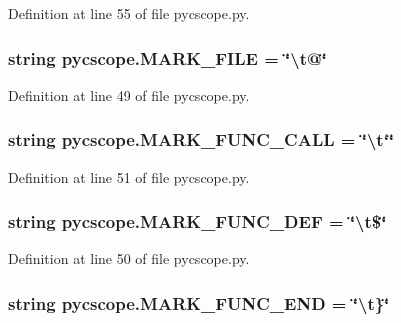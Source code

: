 Definition at line 55 of file pycscope.\-py.

\hypertarget{namespacepycscope_a009264ba488fb81f5c2faf236dc2957e}{
\subsubsection[{M\-A\-R\-K\-\_\-\-F\-I\-L\-E}]{\setlength{\rightskip}{0pt plus 5cm}string pycscope.\-M\-A\-R\-K\-\_\-\-F\-I\-L\-E = \char`\"{}\textbackslash{}t@\char`\"{}}}\label{namespacepycscope_a009264ba488fb81f5c2faf236dc2957e}


Definition at line 49 of file pycscope.\-py.

\hypertarget{namespacepycscope_a0ebe5a435fd0cdaa563d5be84886462d}{
\subsubsection[{M\-A\-R\-K\-\_\-\-F\-U\-N\-C\-\_\-\-C\-A\-L\-L}]{\setlength{\rightskip}{0pt plus 5cm}string pycscope.\-M\-A\-R\-K\-\_\-\-F\-U\-N\-C\-\_\-\-C\-A\-L\-L = \char`\"{}\textbackslash{}t`\char`\"{}}}\label{namespacepycscope_a0ebe5a435fd0cdaa563d5be84886462d}


Definition at line 51 of file pycscope.\-py.

\hypertarget{namespacepycscope_a8ff1f31aa6b2351ef03016d3c8691e90}{
\subsubsection[{M\-A\-R\-K\-\_\-\-F\-U\-N\-C\-\_\-\-D\-E\-F}]{\setlength{\rightskip}{0pt plus 5cm}string pycscope.\-M\-A\-R\-K\-\_\-\-F\-U\-N\-C\-\_\-\-D\-E\-F = \char`\"{}\textbackslash{}t\$\char`\"{}}}\label{namespacepycscope_a8ff1f31aa6b2351ef03016d3c8691e90}


Definition at line 50 of file pycscope.\-py.

\hypertarget{namespacepycscope_aca9e6d1a164786d3fe1cd678d995c31f}{
\subsubsection[{M\-A\-R\-K\-\_\-\-F\-U\-N\-C\-\_\-\-E\-N\-D}]{\setlength{\rightskip}{0pt plus 5cm}string pycscope.\-M\-A\-R\-K\-\_\-\-F\-U\-N\-C\-\_\-\-E\-N\-D = \char`\"{}\textbackslash{}t\}\char`\"{}}}\label{namespacepycscope_aca9e6d1a164786d3fe1cd678d995c31f}


